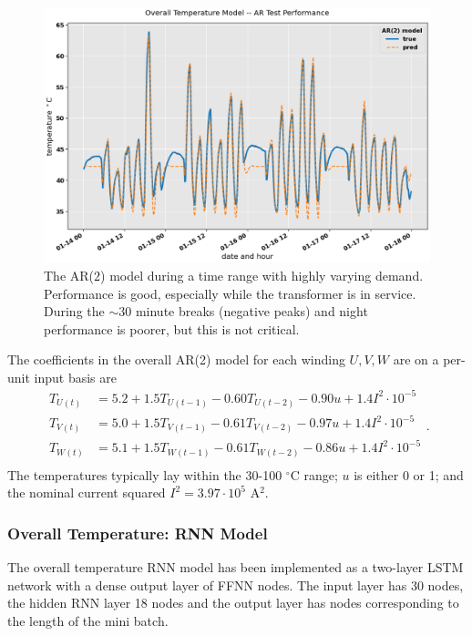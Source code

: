 \documentclass[]{article}
\begin{document}
\begin{figure}[!h]
	\centering
	\includegraphics[width=1\linewidth]{./figs/ar-model-performance.png}
	\caption{The AR($2$) model during a time range with highly varying demand. Performance is good, especially while the transformer is in service. During the $\sim 30$ minute breaks (negative peaks) and night performance is poorer, but this is not critical.}
	\label{fig:ar-model-performance}
\end{figure}

The coefficients in the overall AR(2) model for each winding $U,V,W$ are on a per-unit input basis are
\begin{equation}
\begin{aligned}
	T_{U(t)} &= 5.2 + 1.5T_{U(t-1)} - 0.60T_{U(t-2)}- 0.90u + 1.4I^2 \cdot 10^{-5} \\
	T_{V(t)} &= 5.0 + 1.5T_{V(t-1)} - 0.61T_{V(t-2)}- 0.97u + 1.4I^2 \cdot 10^{-5} \\
	T_{W(t)} &= 5.1 + 1.5T_{W(t-1)} - 0.61T_{W(t-2)}- 0.86u + 1.4I^2 \cdot 10^{-5} \\
\end{aligned}.
\end{equation}
The temperatures typically lay within the 30-100 $^\circ$C range; $u$ is either 0 or 1; and the nominal current squared $I^2 = 3.97 \cdot 10^5$ A$^2$.

\subsubsection{Overall Temperature: RNN Model} \label{sec:results-overall-rnn}
The overall temperature RNN model has been implemented as a two-layer LSTM network with a dense output layer of FFNN nodes. The input layer has 30 nodes, the hidden RNN layer 18 nodes and the output layer has nodes corresponding to the length of the mini batch. 
\end{document}
